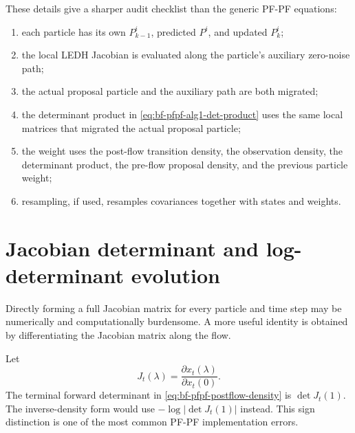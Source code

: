 These details give a sharper audit checklist than the generic PF-PF equations:
\begin{enumerate}[label=(\roman*)]
  \item each particle has its own $P_{k-1}^i$, predicted $P^i$, and updated
    $P_k^i$;
  \item the local LEDH Jacobian is evaluated along the particle's auxiliary
    zero-noise path;
  \item the actual proposal particle and the auxiliary path are both migrated;
  \item the determinant product in
    \eqref{eq:bf-pfpf-alg1-det-product} uses the same local matrices that
    migrated the actual proposal particle;
  \item the weight uses the post-flow transition density, the observation
    density, the determinant product, the pre-flow proposal density, and the
    previous particle weight;
  \item resampling, if used, resamples covariances together with states and
    weights.
\end{enumerate}

\section{Jacobian determinant and log-determinant evolution}
\label{sec:bf-pfpf-logdet}

Directly forming a full Jacobian matrix for every particle and time step may be
numerically and computationally burdensome.  A more useful identity is obtained
by differentiating the Jacobian matrix along the flow.

Let
\begin{equation}
\label{eq:bf-pfpf-jacobian-matrix}
  J_t(\lambda)
  = \frac{\partial x_t(\lambda)}{\partial x_t(0)}.
\end{equation}
The terminal forward determinant in
\eqref{eq:bf-pfpf-postflow-density} is $\det J_t(1)$.  The inverse-density form
would use $-\log|\det J_t(1)|$ instead.  This sign distinction is one of the
most common PF-PF implementation errors.

